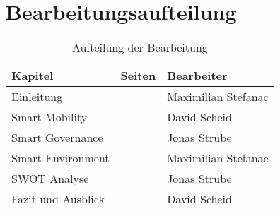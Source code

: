\section{Bearbeitungsaufteilung}

\begin{table}[h] %
	\caption*{Aufteilung der Bearbeitung}
	\begin{center}
		\begin{tabular}{l|l|l}
			Kapitel & Seiten & Bearbeiter \\
			\hline
			\hline
			Einleitung&&Maximilian Stefanac  \\
			Smart Mobility&&David Scheid  \\
			Smart Governance&&Jonas Strube  \\
			Smart Environment&&Maximilian Stefanac  \\
			SWOT Analyse&&Jonas Strube  \\
			Fazit und Ausblick&&David Scheid  \\
			\hline
		\end{tabular}
	\end{center}
\end{table}